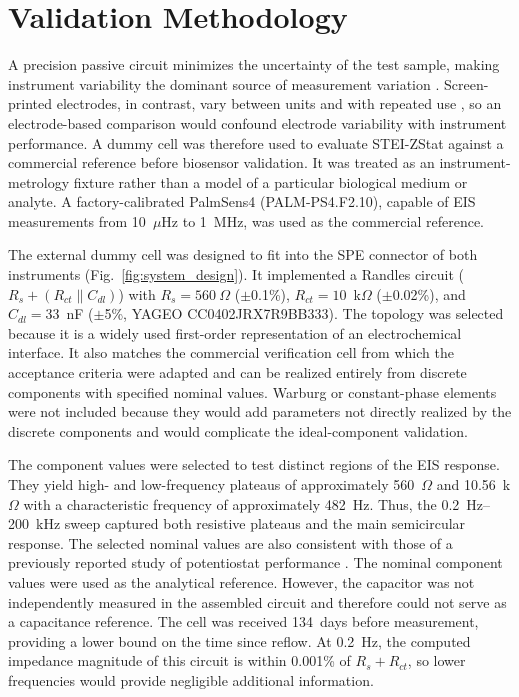\section{Validation Methodology}
A precision passive circuit minimizes the uncertainty of the test sample, making instrument variability the dominant source of measurement variation \cite{kasper2022electrochemical}. Screen-printed electrodes, in contrast, vary between units and with repeated use \cite{anshori2025ganestat, finvsgar2018reusability}, so an electrode-based comparison would confound electrode variability with instrument performance. A dummy cell was therefore used to evaluate STEI-ZStat against a commercial reference before biosensor validation. It was treated as an instrument-metrology fixture rather than a model of a particular biological medium or analyte. A factory-calibrated PalmSens4 (PALM-PS4.F2.10), capable of EIS measurements from 10~$\mu$Hz to 1~MHz, was used as the commercial reference.

The external dummy cell was designed to fit into the SPE connector of both instruments (Fig.~\ref{fig:system_design}). It implemented a Randles circuit ($R_s + (R_{ct} \parallel C_{dl})$) with $R_s = 560~\Omega$ ($\pm$0.1\%), $R_{ct} = 10$~k$\Omega$ ($\pm$0.02\%), and $C_{dl} = 33$~nF ($\pm$5\%, YAGEO CC0402JRX7R9BB333). The topology was selected because it is a widely used first-order representation of an electrochemical interface. It also matches the commercial verification cell from which the acceptance criteria were adapted \cite{gamry2011universal} and can be realized entirely from discrete components with specified nominal values. Warburg or constant-phase elements were not included because they would add parameters not directly realized by the discrete components and would complicate the ideal-component validation.

The component values were selected to test distinct regions of the EIS response. They yield high- and low-frequency plateaus of approximately 560~$\Omega$ and 10.56~k$\Omega$ with a characteristic frequency of approximately 482~Hz. Thus, the 0.2~Hz--200~kHz sweep captured both resistive plateaus and the main semicircular response. The selected nominal values are also consistent with those of a previously reported study of potentiostat performance \cite{wong2024cyclic}. The nominal component values were used as the analytical reference. However, the capacitor was not independently measured in the assembled circuit and therefore could not serve as a capacitance reference. The cell was received 134~days before measurement, providing a lower bound on the time since reflow. At 0.2~Hz, the computed impedance magnitude of this circuit is within 0.001\% of $R_s + R_{ct}$, so lower frequencies would provide negligible additional information.

